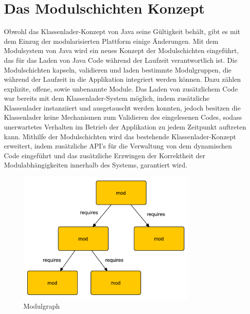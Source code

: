   \section{Das Modulschichten Konzept} \label{sec:module_layers}
     Obwohl das Klassenlader-Konzept von Java seine Gültigkeit behält, gibt es mit dem Einzug der modularisierten Plattform einige Änderungen.\newline 
     Mit dem Modulsystem von Java wird ein neues Konzept der Modulschichten eingeführt, das für das Laden von Java Code während der Laufzeit verantwortlich ist. Die Modulschichten kapseln, validieren und laden bestimmte Modulgruppen, die während der Laufzeit in die Applikation integriert werden können. Dazu zählen explizite, offene, sowie unbenannte Module. \newline
     Das Laden von zusätzlichem Code war bereits mit dem Klassenlader-System möglich, indem zusätzliche Klassenlader instanziiert und ausgetauscht werden konnten, jedoch besitzen die Klassenlader keine Mechanismen zum Validieren des eingelesenen Codes, sodass unerwartetes Verhalten im Betrieb der Applikation zu jedem Zeitpunkt auftreten kann. \newline
     Mithilfe der Modulschichten wird das bestehende Klassenlader-Konzept erweitert, indem zusätzliche API's für die Verwaltung von dem dynamischen Code eingeführt und das zusätzliche Erzwingen der Korrektheit der Modulabhängigkeiten innerhalb des Systems, garantiert wird.\bigbreak

    \begin{figure}[h!]
      \centering
      \includegraphics[width=0.8\textwidth]{material/images/module-graph.pdf}
      \caption{Modulgraph \cite{javaMod9}}
      \label{fig:module-graph}
    \end{figure}

